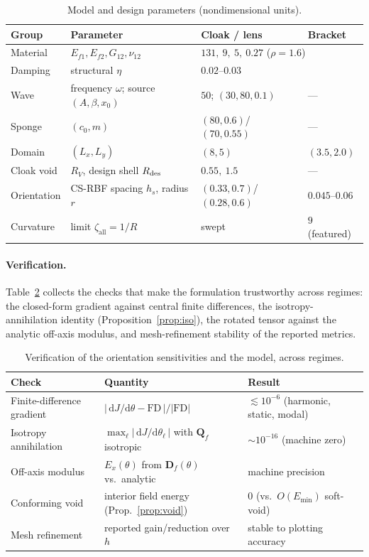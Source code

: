 \documentclass[preprint,11pt]{elsarticle}
\newcommand{\rmd}{\mathrm{d}}
\newcommand{\Df}{\mathbf{D}_f}
\newcommand{\Qf}{\mathbf{Q}_f}
\newcommand{\zall}{\zeta_{\mathrm{all}}}
\theoremstyle{plain}\newtheorem{proposition}{Proposition}
\theoremstyle{remark}\newtheorem{remark}{Remark}
\begin{document}
\begin{table}[htbp]
\centering\small
\caption{Model and design parameters (nondimensional units).}
\label{tab:params}
\begin{tabular}{@{}llll@{}}
\toprule
Group & Parameter & Cloak / lens & Bracket\\
\midrule
Material & $E_{f1},E_{f2},G_{12},\nu_{12}$ & \multicolumn{2}{l}{$131,\ 9,\ 5,\ 0.27$
  \quad($\rho=1.6$)}\\
Damping & structural $\eta$ & \multicolumn{2}{l}{$0.02$--$0.03$}\\
Wave & frequency $\omega$; source $(A,\beta,x_0)$ & $50$; $(30,80,0.1)$ & ---\\
Sponge & $(c_0,m)$ & $(80,0.6)$/$(70,0.55)$ & ---\\
Domain & $(L_x,L_y)$ & $(8,5)$ & $(3.5,2.0)$\\
Cloak void & $R_V$, design shell $R_{\rm des}$ & $0.55,\ 1.5$ & ---\\
Orientation & CS-RBF spacing $h_s$, radius $r$ & $(0.33,0.7)$/$(0.28,0.6)$ & $0.045$--$0.06$\\
Curvature & limit $\zall=1/R$ & swept & $9$ (featured)\\
\bottomrule
\end{tabular}
\end{table}

\paragraph{Verification.} Table~\ref{tab:verify} collects the checks that make the
formulation trustworthy across regimes: the closed-form gradient against central finite
differences, the isotropy-annihilation identity (Proposition~\ref{prop:iso}), the rotated
tensor against the analytic off-axis modulus, and mesh-refinement stability of the reported
metrics.

\begin{table}[htbp]
\centering\small
\caption{Verification of the orientation sensitivities and the model, across regimes.}
\label{tab:verify}
\begin{tabular}{@{}lll@{}}
\toprule
Check & Quantity & Result\\
\midrule
Finite-difference gradient & $|\,\rmd J/\rmd\theta - \mathrm{FD}\,|/|\mathrm{FD}|$
  & $\lesssim10^{-6}$ (harmonic, static, modal)\\
Isotropy annihilation & $\max_\ell|\,\rmd J/\rmd\theta_\ell\,|$ with $\Qf$ isotropic
  & $\sim\!10^{-16}$ (machine zero)\\
Off-axis modulus & $E_x(\theta)$ from $\Df(\theta)$ vs.\ analytic
  & machine precision\\
Conforming void & interior field energy (Prop.~\ref{prop:void})
  & $0$ (vs.\ $O(E_{\min})$ soft-void)\\
Mesh refinement & reported gain/reduction over $h$
  & stable to plotting accuracy\\
\bottomrule
\end{tabular}
\end{table}
\end{document}
